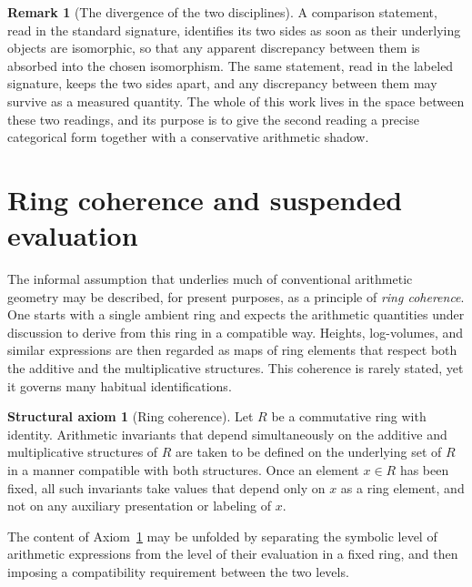 \documentclass[10pt, reqno]{amsart}
\theoremstyle{plain}
\theoremstyle{definition}
\newtheorem{remark}[theorem]{Remark}
\newtheorem{axiom}[theorem]{Structural axiom}
\theoremstyle{plain}
\begin{document}
\begin{remark}[The divergence of the two disciplines]\label{rem:divergence}
A comparison statement, read in the standard signature, identifies its two sides as soon as their underlying objects are isomorphic, so that any apparent discrepancy between them is absorbed into the chosen isomorphism. The same statement, read in the labeled signature, keeps the two sides apart, and any discrepancy between them may survive as a measured quantity. The whole of this work lives in the space between these two readings, and its purpose is to give the second reading a precise categorical form together with a conservative arithmetic shadow.
\end{remark}


\section{Ring coherence and suspended evaluation}\label{sec:ring-coherence}

The informal assumption that underlies much of conventional arithmetic geometry may be described, for present purposes, as a principle of \emph{ring coherence}. One starts with a single ambient ring and expects the arithmetic quantities under discussion to derive from this ring in a compatible way. Heights, log-volumes, and similar expressions are then regarded as maps of ring elements that respect both the additive and the multiplicative structures. This coherence is rarely stated, yet it governs many habitual identifications.

\begin{axiom}[Ring coherence]\label{ax:RingCoherence}
Let $R$ be a commutative ring with identity. Arithmetic invariants that depend simultaneously on the additive and multiplicative structures of $R$ are taken to be defined on the underlying set of $R$ in a manner compatible with both structures. Once an element $x \in R$ has been fixed, all such invariants take values that depend only on $x$ as a ring element, and not on any auxiliary presentation or labeling of $x$.
\end{axiom}

The content of Axiom~\ref{ax:RingCoherence} may be unfolded by separating the symbolic level of arithmetic expressions from the level of their evaluation in a fixed ring, and then imposing a compatibility requirement between the two levels.
\end{document}
